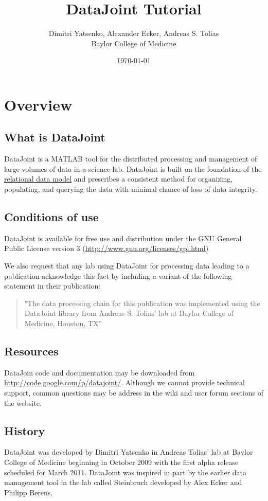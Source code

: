 \documentclass[10pt]{article}
\title{DataJoint Tutorial}
\date{\today} %
\author{Dimitri Yatsenko, Alexander Ecker, Andreas S. Tolias\\{\small Baylor College of Medicine}}
\begin{document}
\maketitle
\tableofcontents
\newpage
\newpage\section{Overview}
\subsection{What is DataJoint}
DataJoint is a MATLAB tool for the distributed processing and management of large volumes of data in a science lab.  DataJoint is built on the foundation of the \href{http://en.wikipedia.org/wiki/Relational_model}{relational data model} and prescribes a consistent method for organizing, populating, and querying the data with minimal chance of loss of data integrity.

\subsection{Conditions of use}
DataJoint is available for free use and distribution under the GNU General Public License version 3 (\url{http://www.gnu.org/licenses/gpl.html})

We also request that any lab using DataJoint for processing data leading to a publication acknowledge this fact by including a variant of the following statement in their publication:
\begin{quote}
"The data processing chain for this publication was implemented using the DataJoint library from Andreas S. Tolias' lab at Baylor College of Medicine, Houston, TX''
\end{quote}

\subsection{Resources}
DataJoin code and documentation may be downloaded from \url{http://code.google.com/p/datajoint/}.  Although we cannot provide technical support, common questions may be address in the wiki and user forum sections of the website.

\subsection{History}
DataJoint was developed by Dimitri Yatsenko in Andreas Tolias' lab at Baylor College of Medicine beginning in October 2009 with the first alpha release scheduled for March 2011. DataJoint was inspired in part by the earlier data management tool in the lab called Steinbruch developed by Alex Ecker and Philipp Berens.
\end{document}
